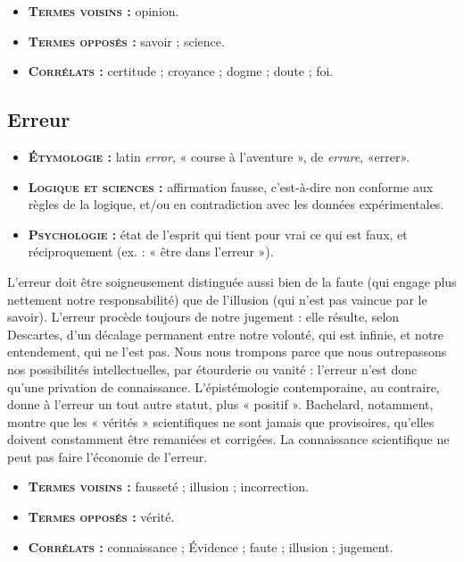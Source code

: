 {\footnotesize
\begin{itemize}[leftmargin=1cm, label=, itemsep=1pt]
\item {\bf \textsc{Termes voisins} :} opinion.
\item {\bf \textsc{Termes opposés} :} savoir ; science.
\item {\bf \textsc{Corrélats} :} certitude ; croyance ;
dogme ; doute ; foi.
\end{itemize}
}


\subsection{Erreur}

{\footnotesize
\begin{itemize}[leftmargin=1cm, label=, itemsep=1pt]
\item {\bf \textsc{Étymologie} :} latin {\it error}, « course
à l'aventure », de {\it errare}, «errer».
\item {\bf \textsc{Logique et sciences} :} affirmation
fausse, c'est-à-dire non conforme
aux règles de la logique, et/ou en
contradiction avec les données
expérimentales.
\item {\bf \textsc{Psychologie} :} état
de l'esprit qui tient pour vrai ce
qui est faux, et réciproquement
(ex. : « être dans l’erreur »).
\end{itemize}
}

L'erreur doit être soigneusement distinguée
aussi bien de la faute (qui engage
plus nettement notre responsabilité) que
de l’illusion (qui n’est pas vaincue par
le savoir). L'erreur procède toujours de
notre jugement : elle résulte, selon Descartes,
d’un décalage permanent entre
notre volonté, qui est infinie, et notre
entendement, qui ne l'est pas. Nous
nous trompons parce que nous outrepassons
nos possibilités intellectuelles,
par étourderie ou vanité : l'erreur n’est
donc qu'une privation de connaissance.
L'épistémologie contemporaine, au
contraire, donne à l’erreur un tout autre
statut, plus « positif ». Bachelard, notamment,
montre que les « vérités » scientifiques
ne sont jamais que provisoires,
qu'elles doivent constamment être remaniées
et corrigées. La connaissance
scientifique ne peut pas faire l'économie
de l’erreur.

{\footnotesize
\begin{itemize}[leftmargin=1cm, label=, itemsep=1pt]
\item {\bf \textsc{Termes voisins} :} fausseté ; illusion ;
incorrection.
\item {\bf \textsc{Termes opposés} :} vérité.
\item {\bf \textsc{Corrélats} :} connaissance ; Évidence ;
faute ; illusion ; jugement.
\end{itemize}
}

